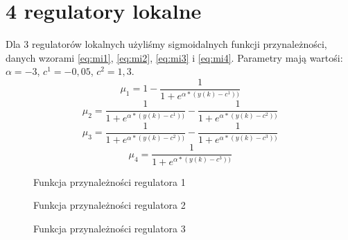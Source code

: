 \section{4 regulatory lokalne}
Dla 3 regulatorów lokalnych użyliśmy sigmoidalnych funkcji przynależności, danych wzorami \ref{eq:mi1}, \ref{eq:mi2}, \ref{eq:mi3} i \ref{eq:mi4}. Parametry mają wartośi: $\alpha = -3$, $c^1 = -0,05$, $c^2=1,3$.
\begin{equation} \label{eq:mi1}
\mu_1 = 1 - \frac{1}{1+e^{\alpha * (y(k)-c^1))}}
\end{equation}
\begin{equation} \label{eq:mi2}
\mu_2 = \frac{1}{1+e^{\alpha * (y(k)-c^1))}} - \frac{1}{1+e^{\alpha * (y(k)-c^2))}}
\end{equation}
\begin{equation} \label{eq:mi3}
\mu_3 = \frac{1}{1+e^{\alpha * (y(k)-c^2))}} - \frac{1}{1+e^{\alpha * (y(k)-c^3))}}
\end{equation}
\begin{equation} \label{eq:mi4}
\mu_4 = \frac{1}{1+e^{\alpha * (y(k)-c^3))}}
\end{equation}

\begin{figure}[H]
\centering
{}
\caption{Funkcja przynależności regulatora 1}
\label{fig:mi4_1}
\end{figure}

\begin{figure}[H]
\centering
{}
\caption{Funkcja przynależności regulatora 2}
\label{fig:mi4_2}
\end{figure}

\begin{figure}[H]
\centering
{}
\caption{Funkcja przynależności regulatora 3}
\label{fig:mi4_3}
\end{figure}

